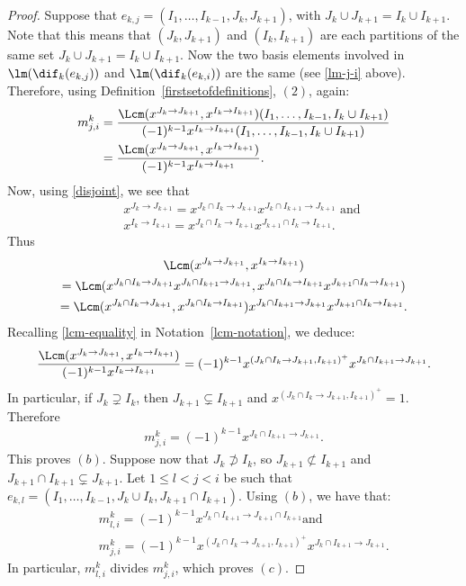 \begin{proof}
Suppose that $e_{k,j}=(I_1,\ldots ,I_{k-1},J_{k},J_{k+1})$, with
$J_k\cup J_{k+1}=I_{k}\cup I_{k+1}$. Note that this means that
$(J_k,J_{k+1})$ and $(I_k,I_{k+1})$ are each partitions of the same
set $J_k\cup J_{k+1}=I_{k}\cup I_{k+1}$. Now the two basis elements
involved in $\lm(\dif_{k}(e_{k,j}))$ and $\lm(\dif_k(e_{k,i}))$ are
the same (see \eqref{lm-j-i} above). Therefore, using
Definition~\ref{firstsetofdefinitions}, $(2)$, again:
\begin{align*}
m^k_{j,i} &= \frac{\Lcm(x^{J_k\to J_{k+1}},x^{I_k\to
      I_{k+1}})(I_1,\ldots ,I_{k-1},I_{k}\cup
    I_{k+1})}{(-1)^{k-1}x^{I_k\to I_{k+1}}(I_1,\ldots
    ,I_{k-1},I_{k}\cup I_{k+1})}
 \\ &= \frac{\Lcm(x^{J_k\to
      J_{k+1}},x^{I_k\to I_{k+1}})}{(-1)^{k-1}x^{I_k\to I_{k+1}}}.
\end{align*}
Now, using \eqref{disjoint}, we see that
\begin{eqnarray*}
&&x^{J_k\to J_{k+1}}=x^{J_k\cap I_{k}\to J_{k+1}}x^{J_{k}\cap I_{k+1}\to
  J_{k+1}}\mbox{ and }\\&&x^{I_k\to I_{k+1}}=x^{J_k\cap I_k\to
  I_{k+1}}x^{J_{k+1}\cap I_k\to I_{k+1}}.
\end{eqnarray*}
Thus
\begin{multline*}
\Lcm(x^{J_k\to J_{k+1}},x^{I_k\to I_{k+1}}) \\
=\Lcm(x^{J_k\cap I_{k}\to J_{k+1}}x^{J_{k}\cap I_{k+1}\to J_{k+1}},x^{J_k\cap
I_k\to I_{k+1}}x^{J_{k+1}\cap I_k\to I_{k+1}})\\
= \Lcm(x^{J_k\cap I_{k}\to J_{k+1}},x^{J_k\cap I_k\to I_{k+1}})
  x^{J_{k}\cap I_{k+1}\to J_{k+1}}x^{J_{k+1}\cap I_k\to I_{k+1}}.
\end{multline*}
Recalling \eqref{lcm-equality} in Notation~\ref{lcm-notation}, we
deduce:
\begin{eqnarray*}
\frac{\Lcm(x^{J_k\to J_{k+1}},x^{I_k\to I_{k+1}})}{(-1)^{k-1}x^{I_k\to
    I_{k+1}}}= (-1)^{k-1}x^{(J_k\cap I_k\to J_{k+1},I_{k+1})^+}
x^{J_k\cap I_{k+1}\to J_{k+1}}.
\end{eqnarray*}
In particular, if $J_k\supsetneq I_k$, then $J_{k+1}\subsetneq
I_{k+1}$ and $x^{(J_k\cap I_k\to J_{k+1},I_{k+1})^+}=1$. Therefore
\begin{eqnarray*}
m^k_{j,i}=(-1)^{k-1}x^{J_k\cap I_{k+1}\to J_{k+1}}.
\end{eqnarray*}
This proves $(b)$. Suppose now that $J_k\not\supset I_k$, so
$J_{k+1}\not\subset I_{k+1}$ and $J_{k+1}\cap I_{k+1}\subsetneq
J_{k+1}$. Let $1\leq l<j<i$ be such that $e_{k,l}=(I_1,\ldots
,I_{k-1},J_k\cup I_k,J_{k+1}\cap I_{k+1})$. Using $(b)$, we have that:
\begin{eqnarray*}
&& m^k_{l,i}=(-1)^{k-1}x^{J_k\cap I_{k+1}\to J_{k+1}\cap I_{k+1}}\mbox{
  and }\\ && m^k_{j,i}=(-1)^{k-1}x^{(J_k\cap I_k\to J_{k+1},I_{k+1})^+}
x^{J_k\cap I_{k+1}\to J_{k+1}}.
\end{eqnarray*}
In particular, $m^k_{l,i}$ divides $m^k_{j,i}$, which proves $(c)$.
\end{proof}

